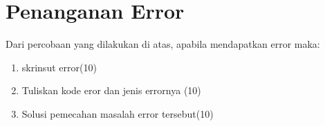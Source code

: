 \section{Penanganan Error}
Dari percobaan yang dilakukan di atas, apabila mendapatkan error maka:

\begin{enumerate}
	\item
	skrinsut error(10)
	\item
Tuliskan kode eror dan jenis errornya (10)
	\item
Solusi pemecahan masalah error tersebut(10)

\end{enumerate}

